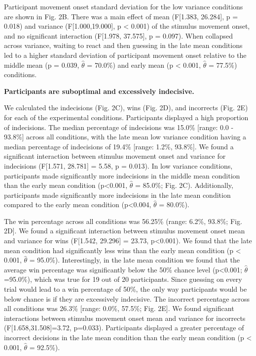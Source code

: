 \documentclass[12pt,letterpaper]{article}
\begin{document}
Participant movement onset standard deviation for the low variance conditions are shown in Fig. 2B. There was a main effect of mean (F[1.383, 26.284], p = 0.018) and variance (F[1.000,19.000], p < 0.001) of the stimulus movement onset, and no significant interaction (F[1.978, 37.575], p = 0.097). When collapsed across variance, waiting to react and then guessing in the late mean conditions led to a higher standard deviation of participant movement onset relative to the middle mean (p = 0.039, $\hat{\theta}$ = 70.0\%) and early mean (p < 0.001, $\hat{\theta}$ = 77.5\%) conditions.

\noindent\textbf{\textcolor{mydarkblue}{{Participants are suboptimal and excessively indecisive.}}}

We calculated the indecisions (Fig. 2C), wins (Fig. 2D), and incorrects (Fig. 2E) for each of the experimental conditions. Participants displayed a high proportion of indecisions. The median percentage of indecisions was 15.0\% [range: 0.0 - 93.8\%] across all conditions, with the late mean low variance condition having a median percentage of indecisions of 19.4\% [range: 1.2\%, 93.8\%]. We found a significant interaction between stimulus movement onset and variance for indecisions (F[1.571, 28.781] = 5.58, p = 0.013). In low variance conditions, participants made significantly more indecisions in the middle mean condition than the early mean condition (p<0.001, $\hat{\theta}$ = 85.0\%; Fig. 2C). Additionally, participants made significantly more indecisions in the late mean condition compared to the early mean condition (p<0.004, $\hat{\theta}$ = 80.0\%).

The win percentage across all conditions was 56.25\% (range: 6.2\%, 93.8\%; Fig. 2D]. We found a significant interaction between stimulus movement onset mean and variance for wins (F[1.542, 29.296] = 23.73, p<0.001). We found that the late mean condition had significantly less wins than the early mean condition (p < 0.001, $\hat{\theta}$ = 95.0\%). Interestingly, in the late mean condition we found that the average win percentage was significantly below the 50\% chance level (p<0.001; $\hat{\theta}$=95.0\%), which was true for 19 out of 20 participants. Since guessing on every trial would lead to a win percentage of 50\%, the only way participants would be below chance is if they are excessively indecisive.
The incorrect percentage across all conditions was 26.3\% [range: 0.0\%, 57.5\%; Fig. 2E]. We found significant interactions between stimulus movement onset mean and variance for incorrects (F[1.658,31.508]=3.72, p=0.033). Participants displayed a greater percentage of incorrect decisions in the late mean condition than the early mean condition (p < 0.001, $\hat{\theta}$ = 92.5\%).
\end{document}
